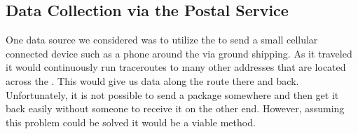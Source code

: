 \subsection{Data Collection via the Postal Service}
One data source we considered was to utilize the \usps to send a small cellular connected device such as a phone around the \us via ground shipping. As it traveled it would continuously run traceroutes to many other \ip addresses that are located across the \us. This would give us data along the route there and back. Unfortunately, it is not possible to send a package somewhere and then get it back easily without someone to receive it on the other end. However, assuming this problem could be solved it would be a viable method.


